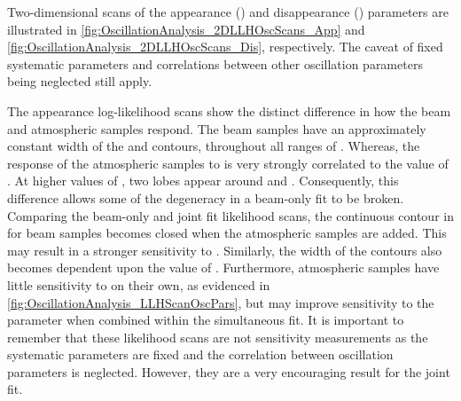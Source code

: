 
Two-dimensional scans of the appearance (\textendash{}) and disappearance (\textendash{}) parameters are illustrated in \autoref{fig:OscillationAnalysis_2DLLHOscScans_App} and \autoref{fig:OscillationAnalysis_2DLLHOscScans_Dis}, respectively. The caveat of fixed systematic parameters and correlations between other oscillation parameters being neglected still apply.

The appearance log-likelihood scans show the distinct difference in how the beam and atmospheric samples respond. The beam samples have an approximately constant width of the \quickmath{2\sigma} and \quickmath{3\sigma} contours, throughout all ranges of . Whereas, the response of the atmospheric samples to  is very strongly correlated to the value of . At higher values of , two lobes appear around  and . Consequently, this difference allows some of the degeneracy in a beam-only fit to be broken. Comparing the beam-only and joint fit likelihood scans, the \quickmath{2\sigma} continuous contour in  for beam samples becomes closed when the atmospheric samples are added. This may result in a stronger sensitivity to . Similarly, the width of the \quickmath{3\sigma} contours also becomes dependent upon the value of . Furthermore, atmospheric samples have little sensitivity to  on their own, as evidenced in \autoref{fig:OscillationAnalysis_LLHScanOscPars}, but may improve sensitivity to the parameter when combined within the simultaneous fit. It is important to remember that these likelihood scans are not sensitivity measurements as the systematic parameters are fixed and the correlation between oscillation parameters is neglected. However, they are a very encouraging result for the joint fit. 


